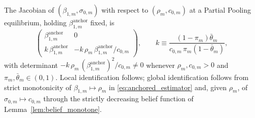 The Jacobian of $(\beta_{1,m},\sigma_{0,m})$ with respect to $(\rho_m,c_{0,m})$ at a Partial
Pooling equilibrium, holding $\beta_{1,m}^{\mathrm{anchor}}$ fixed, is
\[
\begin{pmatrix}
\beta_{1,m}^{\mathrm{anchor}} & 0 \\[2pt]
k\,\beta_{1,m}^{\mathrm{anchor}} & -k\,\rho_m\,\beta_{1,m}^{\mathrm{anchor}}/c_{0,m}
\end{pmatrix},
\qquad
k\equiv\frac{(1-\pi_m)\bar\theta_m}{c_{0,m}\,\pi_m(1-\bar\theta_m)},
\]
with determinant $-k\,\rho_m\,(\beta_{1,m}^{\mathrm{anchor}})^2/c_{0,m}\ne0$ whenever
$\rho_m,c_{0,m}>0$ and $\pi_m,\bar\theta_m\in(0,1)$. Local identification follows; global
identification follows from strict monotonicity of $\beta_{1,m}\mapsto\rho_m$ in
\eqref{eq:anchored_estimator} and, given $\rho_m$, of $\sigma_{0,m}\mapsto c_{0,m}$ through the
strictly decreasing belief function of Lemma~\ref{lem:belief_monotone}.
